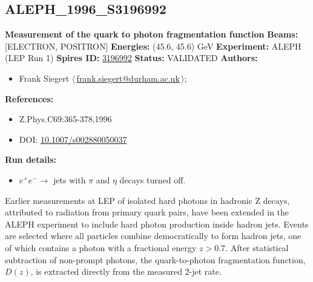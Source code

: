 \clearpage


\clearpage

\subsection[ALEPH\_1996\_S3196992]{ALEPH\_1996\_S3196992\,\cite{Buskulic:1995au}}
\textbf{Measurement of the quark to photon fragmentation function}\newline
\textbf{Beams:} [ELECTRON, POSITRON] \newline
\textbf{Energies:} (45.6, 45.6) GeV \newline
\textbf{Experiment:} ALEPH (LEP Run 1) \newline
\textbf{Spires ID:} \href{http://www.slac.stanford.edu/spires/find/hep/www?rawcmd=key+3196992}{3196992}\newline
\textbf{Status:} VALIDATED\newline
\textbf{Authors:}
\begin{itemize}
  \item Frank Siegert $\langle\,$\href{mailto:frank.siegert@durham.ac.uk}{frank.siegert@durham.ac.uk}$\,\rangle$;
\end{itemize}
\textbf{References:}
\begin{itemize}
  \item Z.Phys.C69:365-378,1996
  \item DOI: \href{http://dx.doi.org/10.1007/s002880050037}{10.1007/s002880050037}
\end{itemize}
\textbf{Run details:}
\begin{itemize}

  \item $e^+e^-\to$ jets with $\pi$ and $\eta$ decays turned off.\end{itemize}

\noindent Earlier measurements at LEP of isolated hard photons in hadronic Z decays, attributed to radiation from primary quark pairs, have been extended in the ALEPH experiment to include hard photon production inside hadron jets. Events are selected where all particles combine democratically to form hadron jets, one of which contains a photon with a fractional energy $z > 0.7$. After statistical subtraction of non-prompt photons, the quark-to-photon fragmentation function, $D(z)$, is extracted directly from the measured 2-jet rate.

\clearpage


\clearpage

